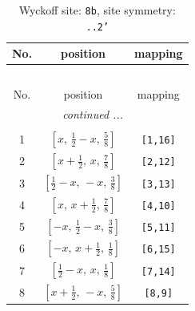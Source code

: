 \documentclass[fleqn,8pt]{jsarticle}
\begin{document}
\begin{longtable}{ccc}
\caption{Wyckoff site: {\tt 8b}, site symmetry: {\tt ..2'}}
 \\
 \hline \hline
No. & position & mapping \\ \hline \endfirsthead

\multicolumn{2}{l}{\tablename\ \thetable{}} \\
 \hline \hline
No. & position & mapping \\ \hline \endhead

 \hline \hline
\multicolumn{2}{r}{\footnotesize\it continued ...} \\ \endfoot

 \hline \hline
\multicolumn{2}{r}{} \\ \endlastfoot

1 & $\left[ x,\, \frac{1}{2} - x,\, \frac{5}{8} \right]$ & {\tt [1,16]} \\ \hline
2 & $\left[ x + \frac{1}{2},\, x,\, \frac{7}{8} \right]$ & {\tt [2,12]} \\ \hline
3 & $\left[ \frac{1}{2} - x,\, - x,\, \frac{3}{8} \right]$ & {\tt [3,13]} \\ \hline
4 & $\left[ x,\, x + \frac{1}{2},\, \frac{7}{8} \right]$ & {\tt [4,10]} \\ \hline
5 & $\left[ - x,\, \frac{1}{2} - x,\, \frac{3}{8} \right]$ & {\tt [5,11]} \\ \hline
6 & $\left[ - x,\, x + \frac{1}{2},\, \frac{1}{8} \right]$ & {\tt [6,15]} \\ \hline
7 & $\left[ \frac{1}{2} - x,\, x,\, \frac{1}{8} \right]$ & {\tt [7,14]} \\ \hline
8 & $\left[ x + \frac{1}{2},\, - x,\, \frac{5}{8} \right]$ & {\tt [8,9]} \\
\end{longtable}
\renewcommand{\arraystretch}{1.2}
\end{document}
